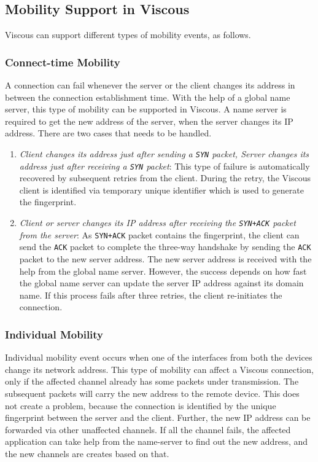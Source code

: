 \subsection{Mobility Support in Viscous}
Viscous can support different types of mobility events, as follows.

\subsubsection{Connect-time Mobility}
A connection can fail whenever the server or the client changes its address in between the connection establishment time. With the help of a global name server, this type of mobility can be supported in Viscous. A name server is required to get the new address of the server, when the server changes its IP address. There are two cases that needs to be handled. 
\begin{enumerate}
    \item \textit{Client changes its address just after sending a \texttt{SYN} packet, Server changes its address just after receiving a \texttt{SYN} packet}: This type of failure is automatically recovered by subsequent retries from the client. During the retry, the Viscous client is identified via temporary unique identifier which is used to generate the fingerprint.
    \item \textit{Client or server changes its IP address after receiving the \texttt{SYN+ACK} packet from the server}: As \texttt{SYN+ACK} packet contains the fingerprint, the client can send the \texttt{ACK} packet to complete the three-way handshake by sending the \texttt{ACK} packet to the new server address. The new server address is received with the help from the global name server. However, the success depends on how fast the global name server can update the server IP address against its domain name. If this process fails after three retries, the client re-initiates the connection. 
\end{enumerate}

\subsubsection{Individual Mobility}
Individual mobility event occurs when one of the interfaces from both the devices change its network address. This type of mobility can affect a Viscous connection, only if the affected channel already has some packets under transmission. The subsequent packets will carry the new address to the remote device. This does not create a problem, because the connection is identified by the unique fingerprint between the server and the client. Further, the new IP address can be forwarded via other unaffected channels. If all the channel fails, the affected application can take help from the name-server to find out the new address, and the new channels are creates based on that.

